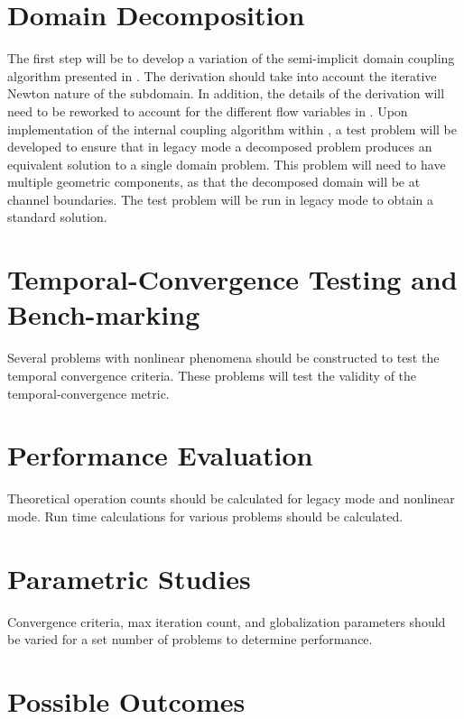 \section{Domain Decomposition}
\label{sect:domain_coupling}
The first step will be to develop a variation of the semi-implicit domain coupling algorithm presented in .
The derivation should take into account the iterative Newton nature of the subdomain. 
In addition, the details of the derivation will need to be reworked to account for the different flow variables in \cobra{}.
Upon implementation of the internal coupling algorithm within \cobra{}, a test problem will be developed to ensure that in legacy mode a decomposed problem produces an equivalent solution to a single domain problem.
This problem will need to have multiple geometric components, as that the decomposed domain will be at channel boundaries.
The test problem will be run in legacy mode to obtain a standard solution.

\section{Temporal-Convergence Testing and Bench-marking}
\label{sect:proposal_temporal_testing}
Several problems with nonlinear phenomena should be constructed to test the temporal convergence criteria.
These problems will test the validity of the temporal-convergence metric.

\section{Performance Evaluation}
\label{sect:proposal_performance_evaluation}
Theoretical operation counts should be calculated for legacy mode and nonlinear mode.
Run time calculations for various problems should be calculated.

\section{Parametric Studies}
\label{sect:proposal_parametric_studies}
Convergence criteria, max iteration count, and globalization parameters should be varied for a set number of problems to determine performance.


\section{Possible Outcomes}
\label{sect:possible_outcomes}


